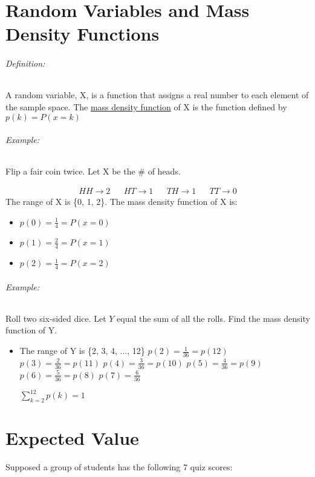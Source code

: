 \documentclass[11pt]{article}
\begin{document}
    \part[Random Variables and Mass Density Functions]{Random Variables and Mass Density Functions}
    \paragraph[Definition]{Definition: } A random variable, X, is a function
    that assigns a real number to each element of the
    sample space. The \underline{mass density function} of X
    is the function defined by
    $p(k) = P(x=k)$

    \paragraph[Example]{Example: } Flip a fair coin twice. Let X be
    the \# of heads.

    \begin{align*}
        HH \to 2 && HT \to 1 && TH \to 1 && TT \to 0
    \end{align*}
    The range of X is \{0, 1, 2\}. The mass density function of
    X is:
    \begin{itemize}
        \item $p(0) = \frac{1}{4} = P(x=0)$
        \item $p(1) = \frac{2}{4} = P(x=1)$
        \item $p(2) = \frac{1}{4} = P(x=2)$
    \end{itemize}
    \paragraph[Example]{Example: } Roll two six-sided dice.
    Let $Y$ equal the sum of all the rolls.
    Find the mass density function of Y.
    \begin{itemize}
        \item The range of Y is \{2, 3, 4, ..., 12\}
        \subitem $p(2) = \frac{1}{36} = p(12)$
        \subitem $p(3) = \frac{2}{36} =p(11)$
        \subitem $p(4) = \frac{3}{36} = p(10)$
        \subitem $p(5) = \frac{4}{36}= p(9)$
        \subitem $p(6) = \frac{5}{36} = p(8)$
        \subitem $p(7) = \frac{6}{36}$

        $ \sum_{k=2}^{12} p(k) = 1$
    \end{itemize}
    \part[Expected Value]{Expected Value}
    Supposed a group of students has the following 7 quiz scores:
\end{document}
